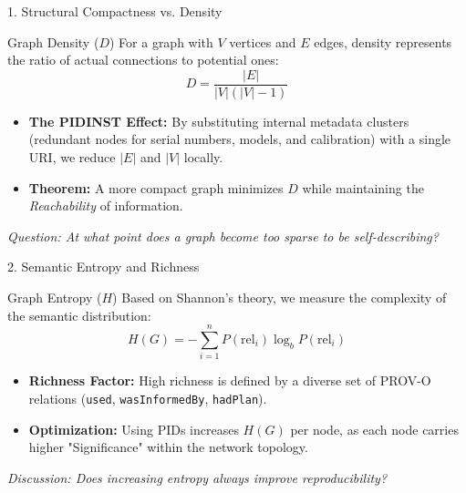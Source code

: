 \documentclass[aspectratio=169]{beamer}
\begin{document}
\begin{frame}{1. Structural Compactness vs. Density}
    \begin{block}{Graph Density ($D$)}
        For a graph with $V$ vertices and $E$ edges, density represents the ratio of actual connections to potential ones:
        \[ D = \frac{|E|}{|V|(|V|-1)} \]
    \end{block}
    \begin{itemize}
        \item \textbf{The PIDINST Effect:} By substituting internal metadata clusters (redundant nodes for serial numbers, models, and calibration) with a single URI, we reduce $|E|$ and $|V|$ locally.
        \item \textbf{Theorem:} A more compact graph minimizes $D$ while maintaining the \textit{Reachability} of information.
    \end{itemize}
    \vfill
    \centering
    \textit{Question: At what point does a graph become too sparse to be self-describing?}
\end{frame}

\begin{frame}{2. Semantic Entropy and Richness}
    \begin{block}{Graph Entropy ($H$)}
        Based on Shannon's theory, we measure the complexity of the semantic distribution:
        \[ H(G) = -\sum_{i=1}^{n} P(\text{rel}_i) \log_b P(\text{rel}_i) \]
    \end{block}
    \begin{itemize}
        \item \textbf{Richness Factor:} High richness is defined by a diverse set of PROV-O relations (\texttt{used}, \texttt{wasInformedBy}, \texttt{hadPlan}).
        \item \textbf{Optimization:} Using PIDs increases $H(G)$ per node, as each node carries higher "Significance" within the network topology.
    \end{itemize}
    \vfill
    \centering
    \textit{Discussion: Does increasing entropy always improve reproducibility?}
\end{frame}
\end{document}
